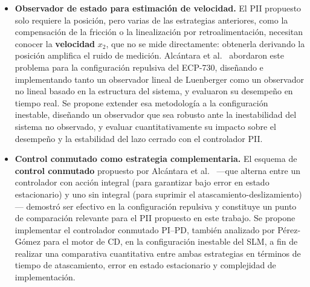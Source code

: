 \begin{itemize}
    \item \textbf{Observador de estado para estimación de velocidad.}
    El PII propuesto solo requiere la posición, pero varias de las estrategias anteriores, como la compensación de la fricción o la linealización por retroalimentación, necesitan conocer la \textbf{velocidad} $x_2$, que no se mide directamente: obtenerla derivando la posición amplifica el ruido de medición. Alcántara et al.\ \cite{alcantara}
    abordaron este problema para la configuración repulsiva del ECP-730, diseñando e
    implementando tanto un observador lineal de Luenberger como un observador no lineal
    basado en la estructura del sistema, y evaluaron su desempeño en tiempo real.
    Se propone extender esa metodología a la configuración inestable, diseñando un observador
    que sea robusto ante la inestabilidad del sistema no observado, y evaluar cuantitativamente
    su impacto sobre el desempeño y la estabilidad del lazo cerrado con el controlador PII.

    \item \textbf{Control conmutado como estrategia complementaria.}
    El esquema de \textbf{control conmutado} propuesto por Alcántara et al.\ \cite{alcantara}
    ---que alterna entre un controlador con acción integral (para garantizar bajo error en estado
    estacionario) y uno sin integral (para suprimir el atascamiento-deslizamiento)--- demostró
    ser efectivo en la configuración repulsiva y constituye un punto de comparación relevante
    para el PII propuesto en este trabajo. Se propone implementar el controlador conmutado
    PI--PD, también analizado por Pérez-Gómez \cite{perez} para el motor de CD, en la
    configuración inestable del SLM, a fin de realizar una comparativa cuantitativa entre
    ambas estrategias en términos de tiempo de atascamiento, error en estado estacionario
    y complejidad de implementación.

\end{itemize}
